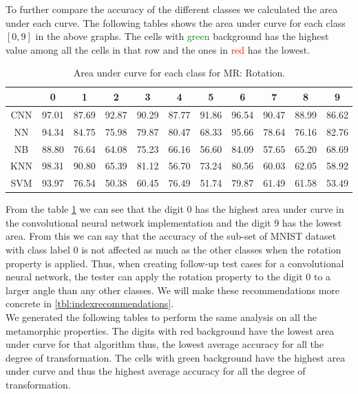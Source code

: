     To further compare the accuracy of the different classes we calculated the area under each curve. The following tables shows the area under curve for each class $[0,9]$ in the above graphs. The cells with \textcolor{green}{green} background has the highest value among all the cells in that row and the ones in \textcolor{red}{red} has the lowest.
    \begin{table}[H]
    \centering
        \begin{tabular}{|c|c|c|c|c|c|c|c|c|c|c|}
        \hline
         & 0 & 1 & 2 & 3 & 4 & 5 & 6 & 7 & 8 & 9 \\
        \hline
        CNN & \cellcolor{green!25} 97.01 & 87.69 & 92.87 & 90.29 & 87.77 & 91.86 & 96.54 & 90.47 & 88.99 & \cellcolor{red!25}86.62 \\ 
        \hline
        NN &   94.34 & 84.75 & 75.98 & 79.87 & 80.47 & \cellcolor{red!25}68.33 & \cellcolor{green!25}95.66 & 78.64 & 76.16 & 82.76 \\
        \hline
        NB & \cellcolor{green!25}88.80 & 76.64 & 64.08 & 75.23 & 66.16 & \cellcolor{red!25}56.60 & 84.09 & 57.65 & 65.20 & 68.69 \\
        \hline
        KNN & \cellcolor{green!25}98.31 & 90.80 & 65.39 & 81.12 & \cellcolor{red!25}56.70 & 73.24 & 80.56 & 60.03 & 62.05 & 58.92 \\
        \hline
        SVM & \cellcolor{green!25}93.97 & 76.54 & \cellcolor{red!25}50.38 & 60.45 & 76.49 & 51.74 & 79.87 & 61.49 & 61.58 & 53.49 \\
        \hline
        \end{tabular}
        \caption{Area under curve for each class for MR: Rotation.}
        \label{tbl:test-file-formatRotate}
    \end{table}
    
     From the table \ref{tbl:test-file-formatRotate} we can see that the digit $0$ has the highest area under curve in the convolutional neural network implementation and the digit $9$ has the lowest area. From this we can say that the accuracy of the sub-set of MNIST dataset with class label $0$ is not affected as much as the other classes when the rotation property is applied. Thus, when creating follow-up test cases for a convolutional neural network, the tester can apply the rotation property to the digit $0$ to a larger angle than any other classes. We will make these recommendations more concrete in \ref{tbl:indexrecommendations}.\\
     We generated the following tables to perform the same analysis on all the metamorphic properties. The digits with red background have the lowest area under curve for that algorithm thus, the lowest average accuracy for all the degree of transformation. The cells with green background have the highest area under curve and thus the highest average accuracy for all the degree of transformation. 
    
